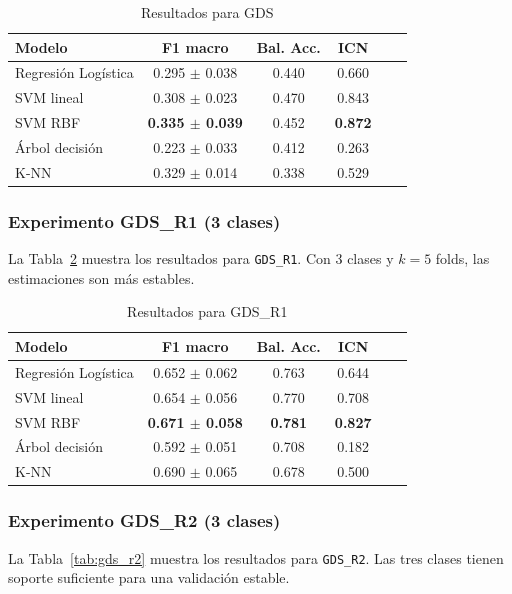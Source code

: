 \documentclass[conference]{IEEEtran}
\begin{document}
\begin{table}[h]
\centering
\caption{Resultados para GDS}
\label{tab:gds}
\begin{tabular}{lccccc}
\toprule
\textbf{Modelo} & \textbf{F1 macro} & \textbf{Bal. Acc.} & \textbf{ICN} \\
\midrule
Regresión Logística & 0.295 $\pm$ 0.038 & 0.440 & 0.660 \\
SVM lineal & 0.308 $\pm$ 0.023 & 0.470 & 0.843 \\
SVM RBF & \textbf{0.335 $\pm$ 0.039} & 0.452 & \textbf{0.872} \\
Árbol decisión & 0.223 $\pm$ 0.033 & 0.412 & 0.263 \\
K-NN & 0.329 $\pm$ 0.014 & 0.338 & 0.529 \\
\bottomrule
\end{tabular}
\end{table}

\subsubsection*{Experimento GDS\_R1 (3 clases)}
La Tabla~\ref{tab:gds_r1} muestra los resultados para \texttt{GDS\_R1}. Con 3 clases y \(k=5\) folds, las estimaciones son más estables.

\begin{table}[h]
\centering
\caption{Resultados para GDS\_R1}
\label{tab:gds_r1}
\begin{tabular}{lccccc}
\toprule
\textbf{Modelo} & \textbf{F1 macro} & \textbf{Bal. Acc.} & \textbf{ICN} \\
\midrule
Regresión Logística & 0.652 $\pm$ 0.062 & 0.763 & 0.644 \\
SVM lineal & 0.654 $\pm$ 0.056 & 0.770 & 0.708 \\
SVM RBF & \textbf{0.671 $\pm$ 0.058} & \textbf{0.781} & \textbf{0.827} \\
Árbol decisión & 0.592 $\pm$ 0.051 & 0.708 & 0.182 \\
K-NN & 0.690 $\pm$ 0.065 & 0.678 & 0.500 \\
\bottomrule
\end{tabular}
\end{table}

\subsubsection*{Experimento GDS\_R2 (3 clases)}
La Tabla~\ref{tab:gds_r2} muestra los resultados para \texttt{GDS\_R2}. Las tres clases tienen soporte suficiente para una validación estable.
\end{document}
